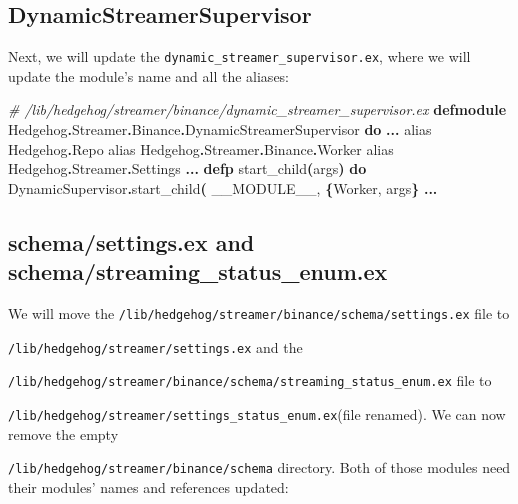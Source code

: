 \documentclass[
  oneside]{book}
\newenvironment{Shaded}{\begin{snugshade}}{\end{snugshade}}
\newcommand{\CommentTok}[1]{\textcolor[rgb]{0.56,0.35,0.01}{\textit{#1}}}
\newcommand{\ConstantTok}[1]{\textcolor[rgb]{0.56,0.35,0.01}{#1}}
\newcommand{\FunctionTok}[1]{\textcolor[rgb]{0.13,0.29,0.53}{\textbf{#1}}}
\newcommand{\ImportTok}[1]{#1}
\newcommand{\KeywordTok}[1]{\textcolor[rgb]{0.13,0.29,0.53}{\textbf{#1}}}
\newcommand{\NormalTok}[1]{#1}
\newcommand{\OperatorTok}[1]{\textcolor[rgb]{0.81,0.36,0.00}{\textbf{#1}}}
\begin{document}
\subsection{DynamicStreamerSupervisor}\label{dynamicstreamersupervisor}

Next, we will update the \texttt{dynamic\_streamer\_supervisor.ex}, where we will update the module's name and all the aliases:

\begin{Shaded}
\begin{Highlighting}[]
\CommentTok{\# /lib/hedgehog/streamer/binance/dynamic\_streamer\_supervisor.ex}
\KeywordTok{defmodule} \ConstantTok{Hedgehog}\OperatorTok{.}\ConstantTok{Streamer}\OperatorTok{.}\ConstantTok{Binance}\OperatorTok{.}\ConstantTok{DynamicStreamerSupervisor} \KeywordTok{do}
\OperatorTok{...}
  \ImportTok{alias} \ConstantTok{Hedgehog}\OperatorTok{.}\ConstantTok{Repo}
  \ImportTok{alias} \ConstantTok{Hedgehog}\OperatorTok{.}\ConstantTok{Streamer}\OperatorTok{.}\ConstantTok{Binance}\OperatorTok{.}\ConstantTok{Worker}
  \ImportTok{alias} \ConstantTok{Hedgehog}\OperatorTok{.}\ConstantTok{Streamer}\OperatorTok{.}\ConstantTok{Settings}
\OperatorTok{...}
  \KeywordTok{defp}\NormalTok{ start\_child}\FunctionTok{(}\NormalTok{args}\FunctionTok{)} \KeywordTok{do}
    \ConstantTok{DynamicSupervisor}\OperatorTok{.}\NormalTok{start\_child}\FunctionTok{(}
      \ConstantTok{\_\_MODULE\_\_}\NormalTok{,}
      \FunctionTok{\{}\ConstantTok{Worker}\NormalTok{, args}\FunctionTok{\}}
\OperatorTok{...}
\end{Highlighting}
\end{Shaded}

\subsection{schema/settings.ex and schema/streaming\_status\_enum.ex}\label{schemasettings.ex-and-schemastreaming_status_enum.ex}

We will move the \texttt{/lib/hedgehog/streamer/binance/schema/settings.ex} file to

\texttt{/lib/hedgehog/streamer/settings.ex} and the

\texttt{/lib/hedgehog/streamer/binance/schema/streaming\_status\_enum.ex} file to

\texttt{/lib/hedgehog/streamer/settings\_status\_enum.ex}(file renamed). We can now remove the empty

\texttt{/lib/hedgehog/streamer/binance/schema} directory. Both of those modules need their modules' names and references updated:
\end{document}
